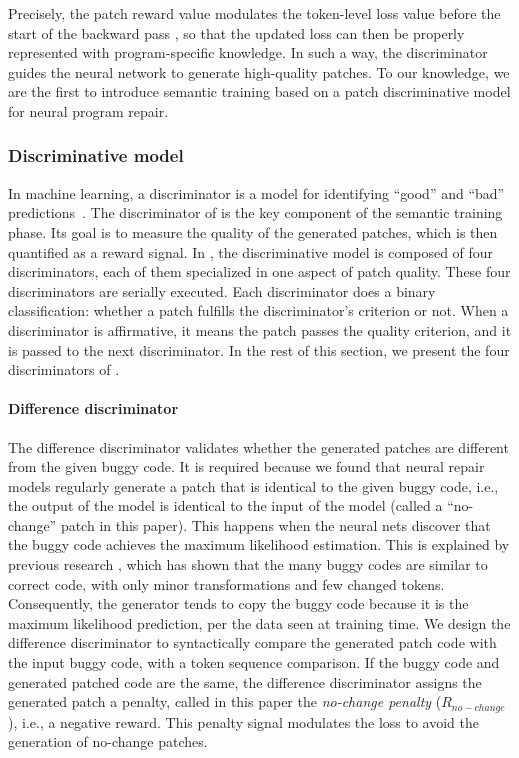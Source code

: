 Precisely, the patch reward value modulates the token-level loss value before the start of the backward pass \cite{micikevicius2018mixed,lossscale,AnchorLoss}, so that the updated loss can then be properly represented with program-specific knowledge.  
In such a way, the discriminator guides the neural network to generate high-quality patches.
To our knowledge, we are the first to introduce  semantic training based on a patch discriminative model for neural program repair.

\subsubsection{Discriminative model} 

In machine learning, a discriminator is a model for identifying ``good'' and ``bad'' predictions~\cite{GanGoodFellow}.
The discriminator of \approach is the key component of the semantic training phase.
Its goal is to measure the quality of the generated patches, which is then quantified as a reward signal. 
In \approach, the discriminative model is composed of four discriminators, each of them specialized in one aspect of patch quality.
These four discriminators are serially executed. 
Each discriminator does a binary classification: whether a patch fulfills the discriminator's criterion or not. When a discriminator is affirmative, it means the patch passes the quality criterion, and it is passed to the next discriminator. 
In the rest of this section, we present the four discriminators of \approach.

\paragraph{Difference discriminator} 
\label{sec:difference_discriminator}
The difference discriminator validates whether the generated patches are different from the given buggy code.  
It is required because we found that neural repair models regularly generate a patch that is identical to the given buggy code, i.e., the output of the model is identical to the input of the model (called a ``no-change'' patch in this paper). 
This happens when the neural nets discover that the buggy code achieves the maximum likelihood estimation. 
This is explained by previous research \cite{TianASE20}, which has shown that the many buggy codes are similar to correct code, with only minor transformations and few changed tokens.
Consequently, the generator tends to copy the buggy code because it is the maximum likelihood prediction, per the data seen at training time.
We design the difference discriminator to syntactically compare the generated patch code with the input buggy code, with a token sequence comparison.
If the buggy code and generated patched code are the same, the  difference discriminator assigns the generated patch a penalty, called in this paper the \textit{no-change penalty} ($R_{no-change}$), i.e., a negative reward.
This penalty signal modulates the \approach loss to avoid the generation of no-change patches.

